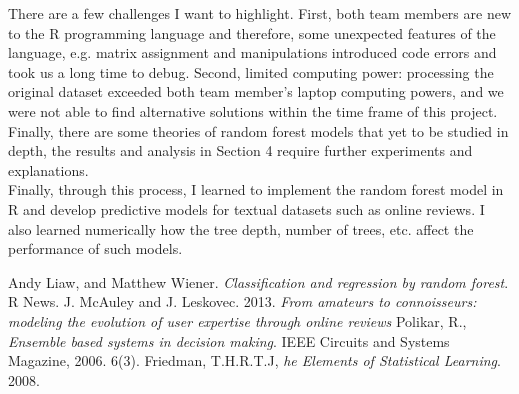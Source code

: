 \documentclass[11pt]{article}
\begin{document}
There are a few challenges I want to highlight. First, both team members are new to the R programming language and therefore, some unexpected features of the language, e.g. matrix assignment and manipulations introduced code errors and took us a long time to debug. Second, limited computing power: processing the original dataset exceeded both team member's laptop computing powers, and we were not able to find alternative solutions within the time frame of this project. Finally, there are some theories of random forest models that yet to be studied in depth, the results and analysis in Section 4 require further experiments and explanations.\\

Finally, through this process, I learned to implement the random forest model in R and develop predictive models for textual datasets such as online reviews. I also learned numerically how the tree depth, number of trees, etc. affect the performance of such models. 

\begin{thebibliography}{9}
 Andy Liaw, and Matthew Wiener. \emph{Classification and regression by random forest}. R News.
 J. McAuley and J. Leskovec. 2013. \emph{From amateurs to connoisseurs: modeling the evolution of user expertise through online reviews}
 Polikar, R., \emph{Ensemble based systems in decision making}. IEEE Circuits and Systems Magazine, 2006. 6(3).
 Friedman, T.H.R.T.J, \emph{he Elements of Statistical Learning}. 2008.

\end{thebibliography}
\end{document}
